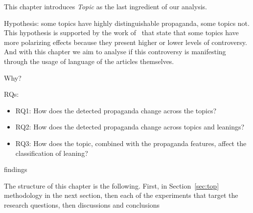 This chapter introduces \emph{Topic} as the last ingredient of our analysis.

Hypothesis: some topics have highly distinguishable propaganda, some topics not.
This hypothesis is supported by the work of~\cite{garimella2018quantifying,treuillier2022being} that state that some topics have more polarizing effects because they present higher or lower levels of controversy.
And with this chapter we aim to analyse if this controversy is manifesting through the usage of language of the articles themselves.



Why?




RQs:
\begin{itemize}
    \item RQ1: How does the detected propaganda change across the topics?
    \item RQ2: How does the detected propaganda change across topics and leanings?
    \item RQ3: How does the topic, combined with the propaganda features, affect the classification of leaning?
\end{itemize}





findings

The structure of this chapter is the following. First, in Section~\ref{sec:top}
methodology in the next section, then each of the experiments that target the research questions, then discussions and conclusions


